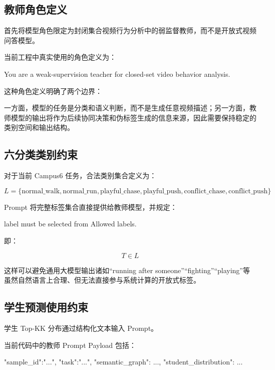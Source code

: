 \subsection{教师角色定义}

首先将模型角色限定为封闭集合视频行为分析中的弱监督教师，而不是开放式视频问答模型。

当前工程中真实使用的角色定义为：

\begin{NotionCode}
You are a weak-supervision teacher for closed-set video behavior analysis.
\end{NotionCode}

这种角色定义明确了两个边界：

一方面，模型的任务是分类和语义判断，而不是生成任意视频描述；另一方面，教师模型的输出将作为后续协同决策和伪标签生成的信息来源，因此需要保持稳定的类别空间和输出结构。

\subsection{六分类类别约束}

对于当前 Campus6 任务，合法类别集合定义为：

\[
L=
\{
\text{normal\_walk},
\text{normal\_run},
\text{playful\_chase},
\text{playful\_push},
\text{conflict\_chase},
\text{conflict\_push}
\}
\]

Prompt 将完整标签集合直接提供给教师模型，并规定：

\begin{NotionCode}
label must be selected from Allowed labels.
\end{NotionCode}

即：

\[
T\in L
\]

这样可以避免通用大模型输出诸如“running after someone”“fighting”“playing”等虽然自然语言上合理、但无法直接参与系统计算的开放式标签。

\subsection{学生预测使用约束}

学生 Top-KK 分布通过结构化文本输入 Prompt。

当前代码中的教师 Prompt Payload 包括：

\begin{NotionCode}
{
  "sample_id":"...",
  "task":"...",
  "semantic_graph": {...},
  "student_distribution": {...}
}
\end{NotionCode}

